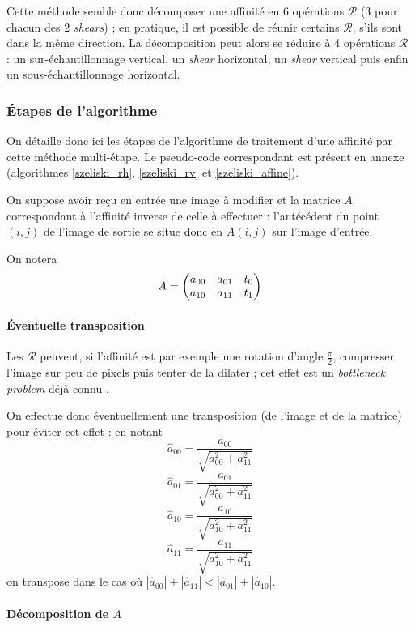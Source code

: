 	Cette méthode semble donc décomposer une affinité en 6 opérations $\mathcal R$ (3 pour chacun des 2 \emph{shears}) ; en pratique, il est possible de réunir certains $\mathcal R$, s'ils sont dans la même direction. La décomposition peut alors se réduire à 4 opérations $\mathcal R$ : un sur-échantillonnage vertical, un \emph{shear} horizontal, un \emph{shear} vertical puis enfin un sous-échantillonnage horizontal.
	
\subsubsection{Étapes de l'algorithme}
	On détaille donc ici les étapes de l'algorithme de traitement d'une affinité par cette méthode multi-étape. Le pseudo-code correspondant est présent en annexe (algorithmes \ref{szeliski_rh}, \ref{szeliski_rv} et \ref{szeliski_affine}).
	
	On suppose avoir reçu en entrée une image à modifier et la matrice $A$ correspondant à l'affinité inverse de celle à effectuer : l'antécédent du point $(i,j)$ de l'image de sortie se situe donc en $A(i,j)$ sur l'image d'entrée.
	
	On notera
	\[A = \begin{pmatrix} a_{00} & a_{01} & t_0\\ a_{10} & a_{11} & t_1 \end{pmatrix}\]
	
	\paragraph{Éventuelle transposition}
		
		Les $\mathcal R$ peuvent, si l'affinité est par exemple une rotation d'angle $\frac{\pi}{2}$, compresser l'image sur peu de pixels puis tenter de la dilater ; cet effet est un \emph{bottleneck problem} déjà connu \cite{wolberg1990digital}.
		
		On effectue donc éventuellement une transposition (de l'image et de la matrice) pour éviter cet effet : en notant
		\[\hat a_{00} = \frac{a_{00}}{\sqrt{a_{00}^2+a_{11}^2}}\]
		\[\hat a_{01} = \frac{a_{01}}{\sqrt{a_{00}^2+a_{11}^2}}\]
		\[\hat a_{10} = \frac{a_{10}}{\sqrt{a_{10}^2+a_{11}^2}}\]
		\[\hat a_{11} = \frac{a_{11}}{\sqrt{a_{10}^2+a_{11}^2}}\]
		on transpose dans le cas où $|\hat a_{00}|+|\hat a_{11}|<|\hat a_{01}|+|\hat a_{10}|$.
		
	\paragraph{Décomposition de $A$}
		
